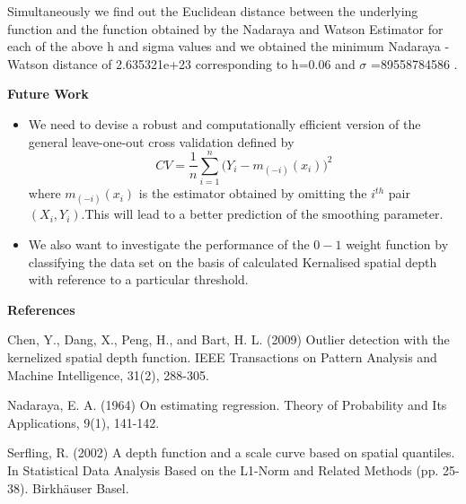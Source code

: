 \documentclass[11pt]{article}
\begin{document}
\begin{flushleft}
 Simultaneously we find out the Euclidean distance between the underlying function and the function obtained by the Nadaraya and Watson Estimator for each of the above h and sigma values and we obtained the minimum Nadaraya -Watson distance of  2.635321e+23 corresponding to h=0.06  and $\sigma$ =89558784586 .
 
 \vspace{0.42in}
\textbf{Future Work}
\vspace{0.1in}
\begin{itemize}
 \item  We need to devise a robust and computationally efficient version of the general leave-one-out cross
validation  defined by 
$$ CV=\frac{1}{n}\displaystyle{\sum\limits_{i=1}^n(Y_i-m_{(-i)}(x_i)})^2$$
where $m_{(-i)}(x_i)$
is the estimator obtained by omitting the $i^{th}$
pair $(X_i
, Y_i)$.This will lead to a better prediction of the smoothing parameter.

 \item We also want to investigate the performance of the $0-1$ weight function by classifying the data set on the basis of calculated Kernalised spatial depth with reference to a particular threshold.
\end{itemize}






\vspace{0.2in}
\textbf{References}
\vspace{0.1in}

\small

Chen, Y., Dang, X., Peng, H., and Bart, H. L. (2009) Outlier detection with the kernelized spatial depth function. IEEE Transactions on Pattern Analysis and Machine Intelligence, 31(2), 288-305.
\vspace{0.05in}


Nadaraya, E. A. (1964) On estimating regression. Theory of Probability and Its Applications, 9(1), 141-142.
\vspace{0.05in}

Serfling, R. (2002) A depth function and a scale curve based on spatial quantiles. In Statistical Data Analysis Based on the L1-Norm and Related Methods (pp. 25-38). Birkhäuser Basel.
\vspace{0.05in}


\end{flushleft}
\end{document}
